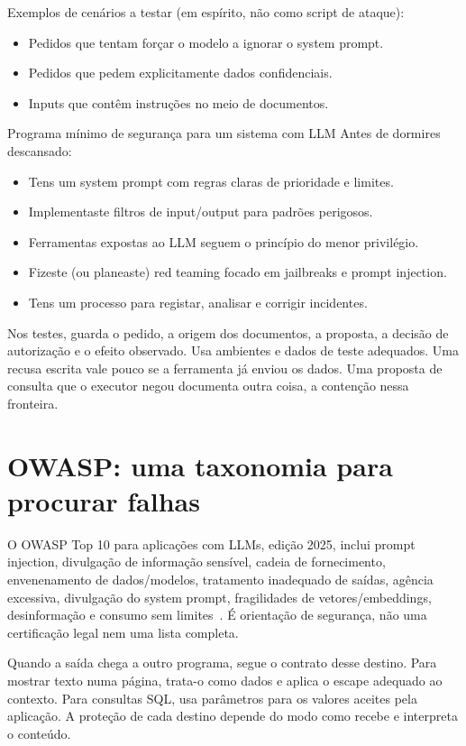 Exemplos de cenários a testar (em espírito, não como script de ataque):

\begin{itemize}[leftmargin=*]
\item Pedidos que tentam forçar o modelo a ignorar o system prompt.
\item Pedidos que pedem explicitamente dados confidenciais.
\item Inputs que contêm instruções no meio de documentos.
\end{itemize}

\begin{checklistbox}{Programa mínimo de segurança para um sistema com LLM}
Antes de dormires descansado:

\begin{itemize}[leftmargin=*]
\item Tens um system prompt com regras claras de prioridade e limites.
\item Implementaste filtros de input/output para padrões perigosos.
\item Ferramentas expostas ao LLM seguem o princípio do menor privilégio.
\item Fizeste (ou planeaste) red teaming focado em jailbreaks e prompt injection.
\item Tens um processo para registar, analisar e corrigir incidentes.
\end{itemize}
\end{checklistbox}

Nos testes, guarda o pedido, a origem dos documentos, a proposta, a decisão de autorização e o efeito observado. Usa ambientes e dados de teste adequados. Uma recusa escrita vale pouco se a ferramenta já enviou os dados. Uma proposta de consulta que o executor negou documenta outra coisa, a contenção nessa fronteira.

\section{OWASP: uma taxonomia para procurar falhas}
O OWASP Top 10 para aplicações com LLMs, edição 2025, inclui prompt injection, divulgação de informação sensível, cadeia de fornecimento, envenenamento de dados/modelos, tratamento inadequado de saídas, agência excessiva, divulgação do system prompt, fragilidades de vetores/embeddings, desinformação e consumo sem limites~\citep{owasp2025}. É orientação de segurança, não uma certificação legal nem uma lista completa.

Quando a saída chega a outro programa, segue o contrato desse destino. Para mostrar texto numa página, trata-o como dados e aplica o escape adequado ao contexto. Para consultas SQL, usa parâmetros para os valores aceites pela aplicação. A proteção de cada destino depende do modo como recebe e interpreta o conteúdo.

